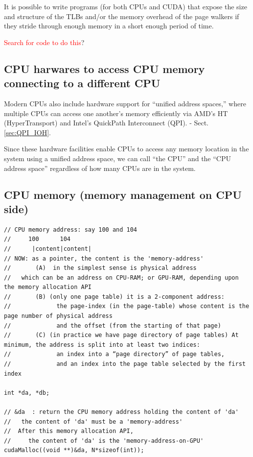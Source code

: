 It is possible to write programs (for both CPUs and CUDA) that expose the size
and structure of the TLBs and/or the memory overhead of the page walkers if they
stride through enough memory in a short enough period of time.

\textcolor{red}{Search for code to do this}?

\subsection{CPU harwares to access CPU memory connecting to a different CPU}

Modern CPUs also include hardware support for “unified address spaces,” where
multiple CPUs can access one another’s memory efficiently via AMD’s HT
(HyperTransport) and Intel’s QuickPath Interconnect (QPI). - Sect.\ref{sec:QPI_IOH}.

Since these hardware facilities enable CPUs to access any memory location in the
system using a unified address space, we can call “the CPU” and the “CPU address
space” regardless of how many CPUs are in the system.

\subsection{CPU memory (memory management on CPU side)}
\label{sec:memory-on-CPU-side}


\begin{verbatim}
// CPU memory address: say 100 and 104
//     100      104
//      |content|content|
// NOW: as a pointer, the content is the 'memory-address'
//       (A)  in the simplest sense is physical address
//   which can be an address on CPU-RAM; or GPU-RAM, depending upon the memory allocation API
//       (B) (only one page table) it is a 2-component address:
//             the page-index (in the page-table) whose content is the page number of physical address
//             and the offset (from the starting of that page)
//       (C) (in practice we have page directory of page tables) At minimum, the address is split into at least two indices: 
//             an index into a “page directory” of page tables, 
//             and an index into the page table selected by the first index

int *da, *db;

// &da  : return the CPU memory address holding the content of 'da'
//   the content of 'da' must be a 'memory-address'
//  After this memory allocation API, 
//     the content of 'da' is the 'memory-address-on-GPU'
cudaMalloc((void **)&da, N*sizeof(int));
\end{verbatim}

